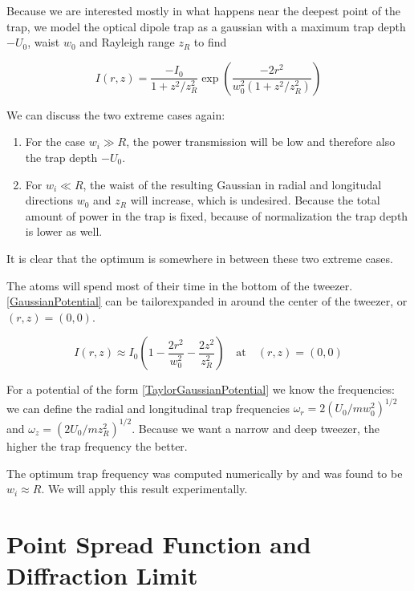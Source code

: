 Because we are interested mostly in what happens near the deepest point of the trap, we model the optical dipole trap as a gaussian with a maximum trap depth $-U_0$, waist $w_0$ and Rayleigh range $z_R$ to find 

\begin{equation}\label{GaussianPotential}
    I(r,z)=\frac{-I_{0}}{1+z^{2} / z_{R}^{2}} \exp \left(\frac{-2 r^{2}}{w_{0}^{2}\left(1+z^{2} / z_{R}^{2}\right)}\right)
\end{equation}

We can discuss the two extreme cases again:

\begin{enumerate}
    \item For the case $w_i \gg R$, the power transmission will be low and therefore also the trap depth $-U_0$.
    \item For $w_i \ll R$, the waist of the resulting Gaussian in radial and longitudal directions $w_0$ and $z_R$ will increase, which is undesired. Because the total amount of power in the trap is fixed, because of normalization the trap depth is lower as well. 
\end{enumerate}

It is clear that the optimum is somewhere in between these two extreme cases.  

The atoms will spend most of their time in the bottom of the tweezer. \cref{GaussianPotential} can be tailorexpanded in around the center of the tweezer, or $(r,z) = (0,0)$.

\begin{equation}\label{TaylorGaussianPotential}
    I(r,z) \approx I_0 \left(1 - \frac{2r^2}{w_0^2} - \frac{2z^2}{z_R^2}\right) \quad \text{at} \quad (r,z) = (0,0)
\end{equation}

For a potential of the form \cref{TaylorGaussianPotential} we know the frequencies: we can define the radial and longitudinal trap frequencies $\omega_r = 2\left(U_0/m w_0^2\right)^{1/2}$ and $\omega_z= \left(2 U_0/m z_R^2\right)^{1/2}$. Because we want a narrow and deep tweezer, the higher the trap frequency the better. 

The optimum trap frequency was computed numerically by \cite{Madjarov2021} and was found to be $w_i \approx R$. We will apply this result experimentally. 


\section{Point Spread Function and Diffraction Limit}

